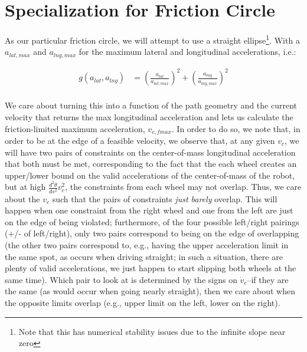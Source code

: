\documentclass{article}
\begin{document}
\section{Specialization for Friction Circle}

As our particular friction circle, we will attempt to use a straight
ellipse\footnote{Note that this has numerical stability issues due to the
infinite slope near zero}.
With a $a_{lat,max}$ and $a_{lng,max}$ for the maximum lateral and longitudinal
accelerations, i.e.:

\begin{align*}
g(a_{lat}, a_{lng}) &= \left(\frac{a_{lat}}{a_{lat,max}}\right)^2
                       + \left(\frac{a_{lng}}{a_{lng,max}}\right)^2 \\
\end{align*}

We care about turning this into a function of the path geometry and the current
velocity that returns the max longitudinal acceleration and lets us calculate
the friction-limited maximum acceleration, $v_{c,fmax}$. In order to do so, we
note that, in order to be at the edge of a feasible velocity, we observe that,
at any given $v_c$, we will have two pairs of constraints on the center-of-mass
longitudinal acceleration that both must be met,
corresponding to the fact that the each wheel creates an upper/lower bound
on the valid accelerations of the center-of-mass of the robot, but at high
$\frac{d^2\theta}{ds^2}v_c^2$, the constraints from each wheel may not overlap.
Thus, we care about the $v_c$ such that the pairs of constraints \emph{just
barely} overlap. This will happen when one constraint from the right wheel and
one from the left are just on the edge of being violated; furthermore, of the
four possible left/right pairings (+/- of left/right), only two pairs correspond
to being on the edge of overlapping (the other two pairs correspond to, e.g.,
having the upper acceleration limit in the same spot, as occurs when driving
straight; in such a situation, there are plenty of valid accelerations, we just
happen to start slipping both wheels at the same time). Which pair to look at is
determined by the signs on $\dot{v}_c$--if they are the same (as would occur
when going nearly straight), then we care about when the opposite limits
overlap (e.g., upper limit on the left, lower on the right).
\end{document}
